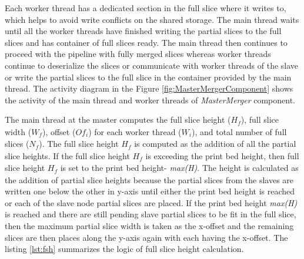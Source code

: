 Each worker thread has a dedicated section in the full slice where it writes to, which helps to avoid write conflicts on the shared storage. The main thread waits until all the worker threads have finished writing the partial slices to the full slices and has container of full slices ready. The main thread then continues to proceed with the pipeline with fully merged slices whereas worker threads continue to deserialize the slices or communicate with worker threads of the slave or write the partial slices to the full slice in the container provided by the main thread. The activity diagram in the Figure \ref{fig:MasterMergerComponent} shows the activity of the main thread and worker threads of \textit{MasterMerger} component. \newline
   
The main thread at the master computes the full slice height (\begin{math}H_{\textit{f}}\end{math}), full slice width (\begin{math}W_{\textit{f}}\end{math}), offset (\begin{math}Of_{\textit{i}}\end{math}) for each worker thread (\begin{math}W_{\textit{i}}\end{math}), and total number of full slices (\begin{math}N_{\textit{f}}\end{math}). The full slice height \begin{math}H_{\textit{f}}\end{math} is computed as the addition of all the partial slice heights. If the full slice height \begin{math}H_{\textit{f}}\end{math} is exceeding the print bed height, then full slice height \begin{math}H_{\textit{f}}\end{math} is set to the print bed height- \textit{max(H)}. The height is calculated as the addition of partial slice heights because the partial slices from the slaves are written one below the other in y-axis until either the print bed height is reached or each of the slave node partial slices are placed. If the print bed height \textit{max(H)} is reached and there are still pending slave partial slices to be fit in the full slice, then the maximum partial slice width is taken as the x-offset and the remaining slices are then places along the y-axis again with each having the x-offset. The listing \ref{lst:fsh} summarizes the logic of full slice height calculation. \newline

